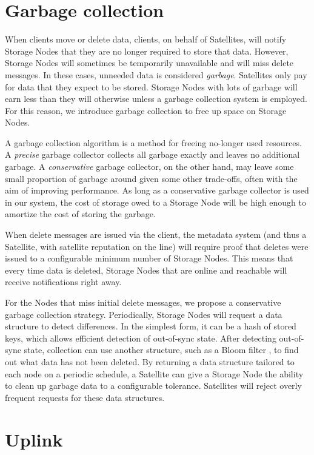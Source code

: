 \documentclass[8pt,fleqn,openany]{book}
\begin{document}
\section{Garbage collection}\label{sec:garbage-collection}

When clients move or delete data, clients, on behalf of Satellites, will notify
Storage Nodes
that they are no longer required to store that data. However,
Storage Nodes will sometimes be temporarily unavailable and will miss delete
messages. In these cases, unneeded data is considered
{\em garbage}. Satellites only pay for data that they expect to be stored. Storage
Nodes with lots of garbage will earn less than they will
otherwise unless a garbage collection system is employed. For this reason, we
introduce garbage collection to free up space on Storage Nodes.

A garbage collection algorithm is a method for freeing no-longer used resources.
A {\em precise} garbage collector collects all garbage exactly and
leaves no additional garbage. A {\em conservative} garbage collector, on the
other hand, may
leave some small proportion of garbage around given some other trade-offs,
often with the aim of improving performance.
As long as a conservative garbage collector is used in our system, the cost of
storage owed to a Storage Node will be high enough to amortize the cost of
storing the garbage.

When delete messages are issued via the client, the metadata system (and thus a
Satellite, with satellite reputation on the line) will require proof that
deletes were issued to a configurable minimum number of Storage Nodes.
This means that every time
data is deleted, Storage Nodes that are online and reachable will receive
notifications right away.

For the Nodes that miss initial delete messages, we propose a conservative
garbage collection strategy. Periodically, Storage Nodes will request
a data structure to detect differences. In the simplest form, it can be a hash
of stored keys, which allows efficient detection of out-of-sync state. After
detecting out-of-sync state, collection can use another structure, such as a
Bloom filter \cite{bloom-filter}, to find out what data has not been
deleted.
By returning a data
structure tailored to each node on a periodic schedule, a Satellite can give a
Storage Node the ability to clean up garbage data to a configurable tolerance.
Satellites will reject overly frequent requests for these data structures.

\section{Uplink}
\end{document}
